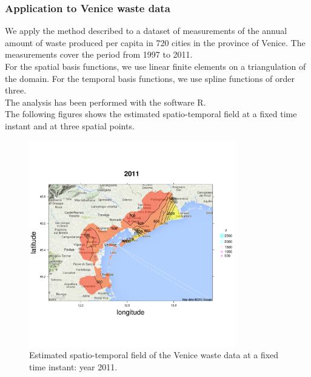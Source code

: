 \documentclass[a4paper,11pt,twoside,openright]{book}							%
\begin{document}
\subsubsection*{Application to Venice waste data}

We apply the method described to a dataset of measurements of the annual amount of waste produced per capita in 720 cities in the province of Venice. The measurements cover the period from 1997 to 2011.\\
For the spatial basis functions, we use linear finite elements on a triangulation of the domain. For the temporal basis functions, we use spline functions of order three.\\
The analysis has been performed with the software R.\\
The following figures shows the estimated spatio-temporal field at a fixed time instant and at three spatial points. 
\begin{figure}[H]
\centering
\includegraphics[trim=0cm 3cm 2.5cm 3.5cm,clip=true,width=0.8\textwidth]{immagini/Maps2011.pdf}
\caption{Estimated spatio-temporal field of the Venice waste data at a fixed time instant: year 2011.}
\label{fig:venezia_previsione}
\end{figure}
\end{document}
